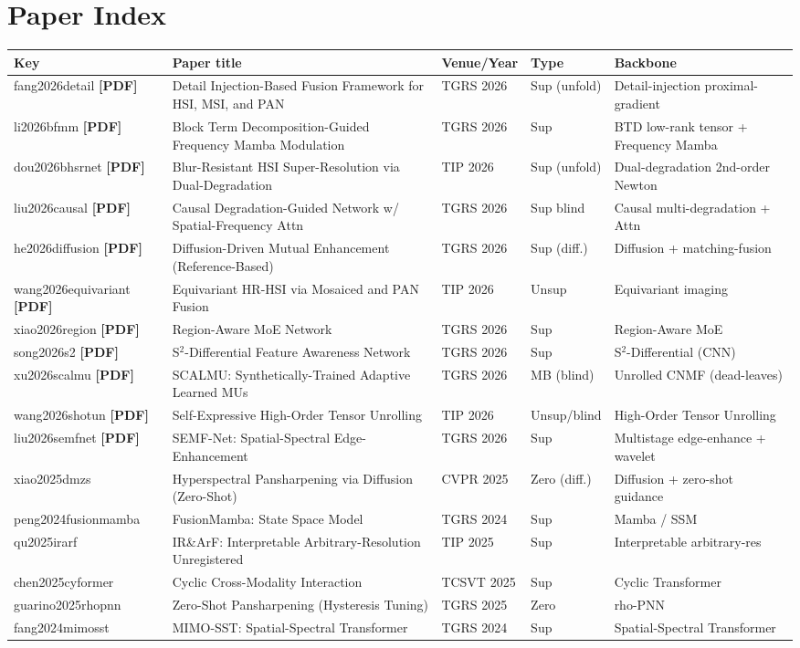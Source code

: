 \documentclass[11pt]{article}
\begin{document}
\section{Paper Index}
\small
\begin{longtable}{@{}p{2.7cm}p{4.4cm}p{1.7cm}p{2.0cm}p{4.0cm}@{}}
\toprule
\textbf{Key} & \textbf{Paper title} & \textbf{Venue/Year} & \textbf{Type} & \textbf{Backbone} \\
\midrule
\endhead
\bottomrule
\endfoot
%
fang2026detail \textbf{[PDF]} & Detail Injection-Based Fusion Framework for HSI, MSI, and PAN & TGRS 2026 & Sup (unfold) & Detail-injection proximal-gradient \\
li2026bfmm \textbf{[PDF]} & Block Term Decomposition-Guided Frequency Mamba Modulation & TGRS 2026 & Sup & BTD low-rank tensor + Frequency Mamba \\
dou2026bhsrnet \textbf{[PDF]} & Blur-Resistant HSI Super-Resolution via Dual-Degradation & TIP 2026 & Sup (unfold) & Dual-degradation 2nd-order Newton \\
liu2026causal \textbf{[PDF]} & Causal Degradation-Guided Network w/ Spatial-Frequency Attn & TGRS 2026 & Sup blind & Causal multi-degradation + Attn \\
he2026diffusion \textbf{[PDF]} & Diffusion-Driven Mutual Enhancement (Reference-Based) & TGRS 2026 & Sup (diff.) & Diffusion + matching-fusion \\
wang2026equivariant \textbf{[PDF]} & Equivariant HR-HSI via Mosaiced and PAN Fusion & TIP 2026 & Unsup & Equivariant imaging \\
xiao2026region \textbf{[PDF]} & Region-Aware MoE Network & TGRS 2026 & Sup & Region-Aware MoE \\
song2026s2 \textbf{[PDF]} & S$^2$-Differential Feature Awareness Network & TGRS 2026 & Sup & S$^2$-Differential (CNN) \\
xu2026scalmu \textbf{[PDF]} & SCALMU: Synthetically-Trained Adaptive Learned MUs & TGRS 2026 & MB (blind) & Unrolled CNMF (dead-leaves) \\
wang2026shotun \textbf{[PDF]} & Self-Expressive High-Order Tensor Unrolling & TIP 2026 & Unsup/blind & High-Order Tensor Unrolling \\
liu2026semfnet \textbf{[PDF]} & SEMF-Net: Spatial-Spectral Edge-Enhancement & TGRS 2026 & Sup & Multistage edge-enhance + wavelet \\
xiao2025dmzs & Hyperspectral Pansharpening via Diffusion (Zero-Shot) & CVPR 2025 & Zero (diff.) & Diffusion + zero-shot guidance \\
peng2024fusionmamba & FusionMamba: State Space Model & TGRS 2024 & Sup & Mamba / SSM \\
qu2025irarf & IR\&ArF: Interpretable Arbitrary-Resolution Unregistered & TIP 2025 & Sup & Interpretable arbitrary-res \\
chen2025cyformer & Cyclic Cross-Modality Interaction & TCSVT 2025 & Sup & Cyclic Transformer \\
guarino2025rhopnn & Zero-Shot Pansharpening (Hysteresis Tuning) & TGRS 2025 & Zero & rho-PNN \\
fang2024mimosst & MIMO-SST: Spatial-Spectral Transformer & TGRS 2024 & Sup & Spatial-Spectral Transformer \\
\end{longtable}
\end{document}
